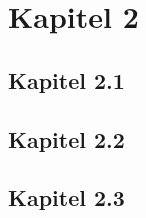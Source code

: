 \section{Kapitel 2} \label{sec:Kapitel_2} \thispagestyle{firstsection}
\subsection{Kapitel 2.1} \label{sec:2_1}



\clearpage
\subsection{Kapitel 2.2} \label{sec:2_2}




\subsection{Kapitel 2.3} \label{sec:2_3}

